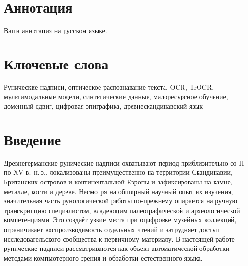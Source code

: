 \documentclass[a4paper,12pt]{extarticle}
\begin{document}
\newpage
\setcounter{page}{2}

{
	\hypersetup{linkcolor=black}
	\tableofcontents
}

\newpage

\newpage
\section*{Аннотация}   %
Ваша аннотация на русском языке.


\section*{Ключевые слова}
Рунические надписи, оптическое распознавание текста, OCR, TrOCR, мультимодальные модели, синтетические данные, малоресурсное обучение, доменный сдвиг, цифровая эпиграфика, древнескандинавский язык
\pagebreak

\section*{Введение}
 
Древнегерманские рунические надписи охватывают период приблизительно со II по XV в.\ н.\,э., локализованы преимущественно на территории Скандинавии, Британских островов и континентальной Европы и зафиксированы на камне, металле, кости и дереве. Несмотря на обширный научный опыт их изучения, значительная часть рунологической работы по-прежнему опирается на ручную транскрипцию специалистом, владеющим палеографической и археологической компетенциями. Это создаёт узкие места при оцифровке музейных коллекций, ограничивает воспроизводимость отдельных чтений и затрудняет доступ исследовательского сообщества к первичному материалу. В настоящей работе рунические надписи рассматриваются как объект автоматической обработки методами компьютерного зрения и обработки естественного языка.
 
\end{document}

